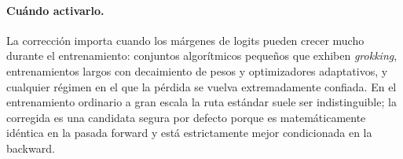 \paragraph{Cuándo activarlo.} La corrección importa cuando los márgenes de logits pueden crecer mucho durante el entrenamiento: conjuntos algorítmicos pequeños que exhiben \emph{grokking}, entrenamientos largos con decaimiento de pesos y optimizadores adaptativos, y cualquier régimen en el que la pérdida se vuelva extremadamente confiada. En el entrenamiento ordinario a gran escala la ruta estándar suele ser indistinguible; la corregida es una candidata segura por defecto porque es matemáticamente idéntica en la pasada forward y está estrictamente mejor condicionada en la backward.
